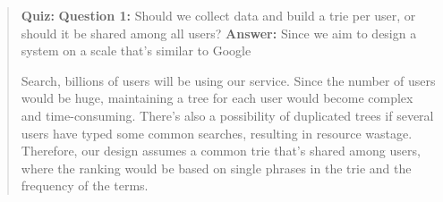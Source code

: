 \begin{quote}
\textbf{Quiz:}
\textbf{Question 1:} Should we collect data and build a trie per user, or should it be shared among all users?
\textbf{Answer:} Since we aim to design a system on a scale that's similar to Google

Search, billions of users will be using our service. Since the number of users would be huge, maintaining a tree for each user would become complex and time-consuming. There's also a possibility of duplicated trees if several users have typed some common searches, resulting in resource wastage. Therefore, our design assumes a common trie that's shared among users, where the ranking would be based on single phrases in the trie and the frequency of the terms.
\end{quote}

